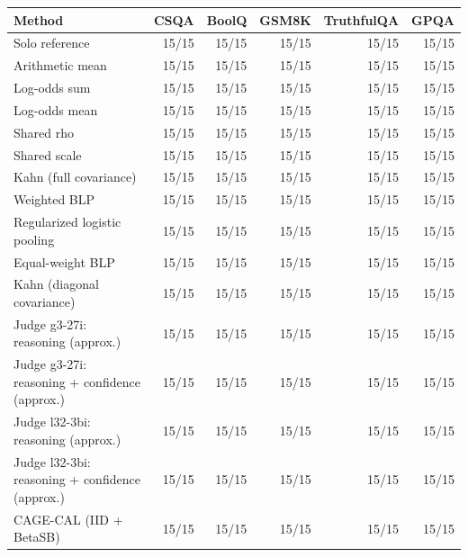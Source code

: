 \begin{tabular}{lrrrrr}
\toprule
Method & CSQA & BoolQ & GSM8K & TruthfulQA & GPQA \\
\midrule
Solo reference & 15/15 & 15/15 & 15/15 & 15/15 & 15/15 \\
Arithmetic mean & 15/15 & 15/15 & 15/15 & 15/15 & 15/15 \\
Log-odds sum & 15/15 & 15/15 & 15/15 & 15/15 & 15/15 \\
Log-odds mean & 15/15 & 15/15 & 15/15 & 15/15 & 15/15 \\
Shared rho & 15/15 & 15/15 & 15/15 & 15/15 & 15/15 \\
Shared scale & 15/15 & 15/15 & 15/15 & 15/15 & 15/15 \\
Kahn (full covariance) & 15/15 & 15/15 & 15/15 & 15/15 & 15/15 \\
Weighted BLP & 15/15 & 15/15 & 15/15 & 15/15 & 15/15 \\
Regularized logistic pooling & 15/15 & 15/15 & 15/15 & 15/15 & 15/15 \\
Equal-weight BLP & 15/15 & 15/15 & 15/15 & 15/15 & 15/15 \\
Kahn (diagonal covariance) & 15/15 & 15/15 & 15/15 & 15/15 & 15/15 \\
Judge g3-27i: reasoning (approx.) & 15/15 & 15/15 & 15/15 & 15/15 & 15/15 \\
Judge g3-27i: reasoning + confidence (approx.) & 15/15 & 15/15 & 15/15 & 15/15 & 15/15 \\
Judge l32-3bi: reasoning (approx.) & 15/15 & 15/15 & 15/15 & 15/15 & 15/15 \\
Judge l32-3bi: reasoning + confidence (approx.) & 15/15 & 15/15 & 15/15 & 15/15 & 15/15 \\
CAGE-CAL (IID + BetaSB) & 15/15 & 15/15 & 15/15 & 15/15 & 15/15 \\
\bottomrule
\end{tabular}
